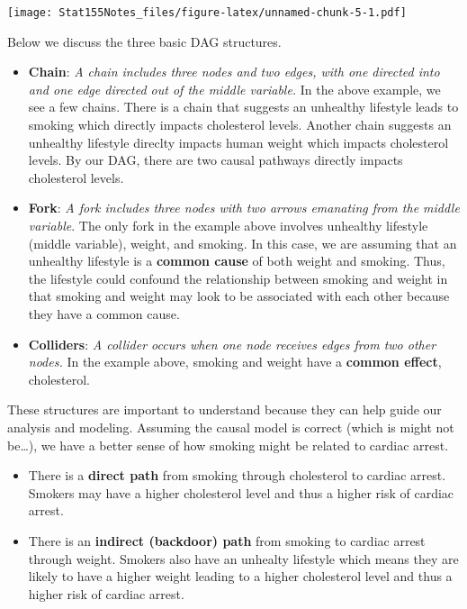 \documentclass[]{book}
\providecommand{\tightlist}{%
  \setlength{\itemsep}{0pt}\setlength{\parskip}{0pt}}
\begin{document}
\texttt{[image: Stat155Notes\_files/figure-latex/unnamed-chunk-5-1.pdf]}

Below we discuss the three basic DAG structures.

\begin{itemize}
\item
  \textbf{Chain}: \emph{A chain includes three nodes and two edges, with one directed into and one edge directed out of the middle variable.} In the above example, we see a few chains. There is a chain that suggests an unhealthy lifestyle leads to smoking which directly impacts cholesterol levels. Another chain suggests an unhealthy lifestyle direclty impacts human weight which impacts cholesterol levels. By our DAG, there are two causal pathways directly impacts cholesterol levels.
\item
  \textbf{Fork}: \emph{A fork includes three nodes with two arrows emanating from the middle variable}. The only fork in the example above involves unhealthy lifestyle (middle variable), weight, and smoking. In this case, we are assuming that an unhealthy lifestyle is a \textbf{common cause} of both weight and smoking. Thus, the lifestyle could confound the relationship between smoking and weight in that smoking and weight may look to be associated with each other because they have a common cause.
\item
  \textbf{Colliders}: \emph{A collider occurs when one node receives edges from two other nodes.} In the example above, smoking and weight have a \textbf{common effect}, cholesterol.
\end{itemize}

These structures are important to understand because they can help guide our analysis and modeling. Assuming the causal model is correct (which is might not be\ldots{}), we have a better sense of how smoking might be related to cardiac arrest.

\begin{itemize}
\tightlist
\item
  There is a \textbf{direct path} from smoking through cholesterol to cardiac arrest. Smokers may have a higher cholesterol level and thus a higher risk of cardiac arrest.
\item
  There is an \textbf{indirect (backdoor) path} from smoking to cardiac arrest through weight. Smokers also have an unhealty lifestyle which means they are likely to have a higher weight leading to a higher cholesterol level and thus a higher risk of cardiac arrest.
\end{itemize}
\end{document}
